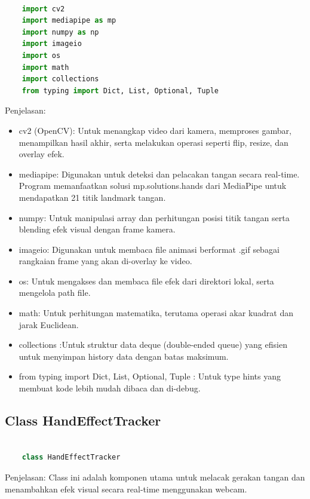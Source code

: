 \documentclass[11pt,a4paper]{article}
\begin{document}
    \begin{lstlisting}[language=Python, caption=Library yang Digunakan]
    
    import cv2
    import mediapipe as mp
    import numpy as np
    import imageio
    import os
    import math
    import collections
    from typing import Dict, List, Optional, Tuple
    \end{lstlisting}
    Penjelasan:
    \begin{itemize}
    \item cv2 (OpenCV): Untuk menangkap video dari kamera, memproses gambar, menampilkan hasil akhir, serta melakukan operasi seperti flip, resize, dan overlay efek.
    \item mediapipe: Digunakan untuk deteksi dan pelacakan tangan secara real-time. Program memanfaatkan solusi mp.solutions.hands dari MediaPipe untuk mendapatkan 21 titik landmark tangan.
    \item numpy: Untuk manipulasi array dan perhitungan posisi titik tangan serta blending efek visual dengan frame kamera.
    \item imageio: Digunakan untuk membaca file animasi berformat .gif sebagai rangkaian frame yang akan di-overlay ke video.
    \item os: Untuk mengakses dan membaca file efek dari direktori lokal, serta mengelola path file.
    \item math: Untuk perhitungan matematika, terutama operasi akar kuadrat dan jarak Euclidean.
    \item collections :Untuk struktur data deque (double-ended queue) yang efisien untuk menyimpan history data dengan batas maksimum.
    \item from typing import Dict, List, Optional, Tuple : Untuk type hints yang membuat kode lebih mudah dibaca dan di-debug.
    \end{itemize}

    \subsection{Class HandEffectTracker}
    \begin{lstlisting}[language=Python, caption=HandEffectTracker]
        
    class HandEffectTracker
    \end{lstlisting}
    Penjelasan:
    Class ini adalah komponen utama untuk melacak gerakan tangan dan menambahkan efek visual secara real-time menggunakan webcam.
\end{document}
